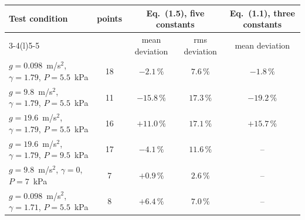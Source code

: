 \begin{tabular}{@{}l c c c c@{}}
\toprule
Test condition & points & \multicolumn{2}{c}{Eq.~(1.5), five constants} & Eq.~(1.1), three constants\\
\cmidrule(lr){3-4}\cmidrule(l){5-5}
 & & mean deviation & rms deviation & mean deviation\\
\midrule
$g=0.098$~m/s$^2$, $\gamma=1.79$, $P=5.5$~kPa & 18 & $-2.1\,\%$ & $7.6\,\%$ & $-1.8\,\%$\\
$g=9.8$~m/s$^2$, $\gamma=1.79$, $P=5.5$~kPa & 11 & $\mathbf{-15.8\,\%}$ & $17.3\,\%$ & $-19.2\,\%$\\
$g=19.6$~m/s$^2$, $\gamma=1.79$, $P=5.5$~kPa & 16 & $\mathbf{+11.0\,\%}$ & $17.1\,\%$ & $+15.7\,\%$\\
$g=19.6$~m/s$^2$, $\gamma=1.79$, $P=9.5$~kPa & 17 & $-4.1\,\%$ & $11.6\,\%$ & --\\
$g=9.8$~m/s$^2$, $\gamma=0$, $P=7$~kPa & 7 & $+0.9\,\%$ & $2.6\,\%$ & --\\
$g=0.098$~m/s$^2$, $\gamma=1.71$, $P=5.5$~kPa & 8 & $+6.4\,\%$ & $7.0\,\%$ & --\\
\bottomrule
\end{tabular}
